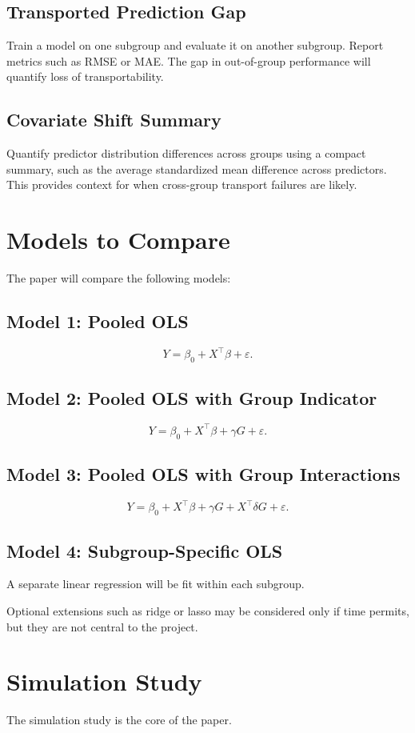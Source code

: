 \documentclass[11pt]{article}
\begin{document}
\subsection{Transported Prediction Gap}
Train a model on one subgroup and evaluate it on another subgroup. Report metrics such as RMSE or MAE. The gap in out-of-group performance will quantify loss of transportability.

\subsection{Covariate Shift Summary}
Quantify predictor distribution differences across groups using a compact summary, such as the average standardized mean difference across predictors. This provides context for when cross-group transport failures are likely.

\section{Models to Compare}
The paper will compare the following models:

\subsection*{Model 1: Pooled OLS}
\[
Y = \beta_0 + X^\top \beta + \varepsilon.
\]

\subsection*{Model 2: Pooled OLS with Group Indicator}
\[
Y = \beta_0 + X^\top \beta + \gamma G + \varepsilon.
\]

\subsection*{Model 3: Pooled OLS with Group Interactions}
\[
Y = \beta_0 + X^\top \beta + \gamma G + X^\top \delta G + \varepsilon.
\]

\subsection*{Model 4: Subgroup-Specific OLS}
A separate linear regression will be fit within each subgroup.

Optional extensions such as ridge or lasso may be considered only if time permits, but they are not central to the project.

\section{Simulation Study}
The simulation study is the core of the paper.
\end{document}
